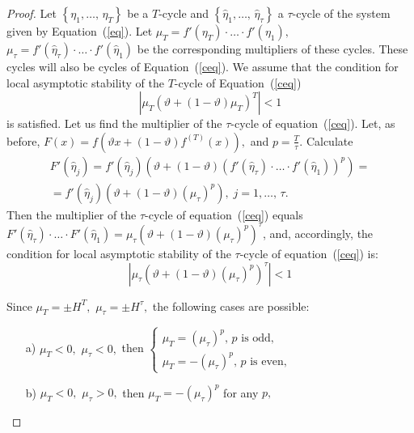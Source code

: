 \documentclass[12pt,a4paper]{amsart}
\begin{document}
\begin{proof}
Let $\left\{\eta_1,\ldots,\,\eta_T\right\}$ be a $T$-cycle and $\left\{\widehat{\eta}_1,\ldots,\,\widehat{\eta}_\tau\right\}$ a $\tau$-cycle of 
the system given by Equation~(\ref{eq}). Let $\mu_T = f'(\eta_T)\cdot\ldots\cdot f'(\eta_1),$ $\mu_\tau = f'(\widehat{\eta}_\tau)\cdot\ldots\cdot f'(\widehat{\eta}_1)$ 
be the corresponding multipliers of these cycles. These cycles will also be  cycles of Equation~(\ref{ceq}). We assume that the condition for local 
asymptotic stability of the $T$-cycle of Equation~(\ref{ceq})
\begin{equation}\label{tc}
\left| \mu_T \left( \vartheta + (1 - \vartheta) \mu_T\right)^T\right| < 1 
\end{equation}
is satisfied. Let us find the multiplier of the $\tau$-cycle of equation~(\ref{ceq}). Let, as before, 
$F(x) = f \left( \vartheta x + (1-\vartheta) f^{(T)}(x)\right),$ and $p=\frac{T}{\tau}.$ Calculate
\begin{gather*}
F'(\widehat{\eta}_j) = f'(\widehat{\eta}_j) \left( \vartheta + (1-\vartheta) \left( f'(\widehat{\eta}_\tau)\cdot\ldots\cdot f'(\widehat{\eta}_1) \right)^p \right) = \\
= f'(\widehat{\eta}_j) \left( \vartheta + (1-\vartheta) (\mu_\tau)^p \right),\; j=1,\ldots,\,\tau.
\end{gather*}
Then the multiplier of the $\tau$-cycle of equation~(\ref{ceq}) equals 
$F'(\widehat{\eta}_\tau)\cdot\ldots\cdot F'(\widehat{\eta}_1) = \mu_\tau \left( \vartheta + (1-\vartheta) (\mu_\tau)^p \right)^\tau$, and, accordingly, 
the condition for local asymptotic stability of the $\tau$-cycle of equation~(\ref{ceq}) is:
\begin{equation}\label{tauc}
\left| \mu_\tau \left( \vartheta + (1 - \vartheta) (\mu_\tau)^p \right)^\tau \right| < 1 
\end{equation}

Since $\mu_T = \pm H^T,$ $\mu_\tau = \pm H^\tau,$ the following cases are possible:

\begin{enumerate}
\item[a)] $\mu_T<0,$ $\mu_\tau<0,$ then 
$\left\{\begin{array}{ll}
\mu_T = (\mu_\tau)^p,\, p \text{ is odd}, \\
\mu_T = -(\mu_\tau)^p,\, p \text{ is even},
\end{array}\right.$

\medskip
\item[b)] $\mu_T<0,$ $\mu_\tau>0,$ then $\mu_T = -(\mu_\tau)^p$ for any $p,$  


\end{enumerate}
\end{proof}
\end{document}
